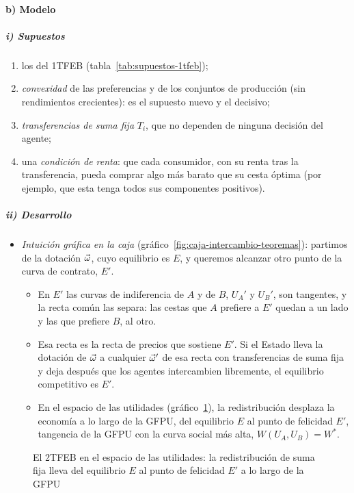 \documentclass[11pt]{article}
\begin{document}
\paragraph{b) Modelo}

\subparagraph{i) Supuestos}

\begin{enumerate}
\item los del 1TFEB (tabla~\ref{tab:supuestos-1tfeb});
\item \emph{convexidad} de las preferencias y de los conjuntos de producción (sin rendimientos crecientes): es el supuesto nuevo y el decisivo;
\item \emph{transferencias de suma fija} $T_i$, que no dependen de ninguna decisión del agente;
\item una \emph{condición de renta}: que cada consumidor, con su renta tras la transferencia, pueda comprar algo más barato que su cesta óptima (por ejemplo, que esta tenga todos sus componentes positivos).
\end{enumerate}

\subparagraph{ii) Desarrollo}

\begin{itemize}
\item \emph{Intuición gráfica en la caja} (gráfico~\ref{fig:caja-intercambio-teoremas}): partimos de la dotación $\vec{\omega}$, cuyo equilibrio es $E$, y queremos alcanzar otro punto de la curva de contrato, $E'$.
  \begin{itemize}
  \item En $E'$ las curvas de indiferencia de $A$ y de $B$, $U_A'$ y $U_B'$, son tangentes, y la recta común las separa: las cestas que $A$ prefiere a $E'$ quedan a un lado y las que prefiere $B$, al otro.
  \item Esa recta es la recta de precios que sostiene $E'$. Si el Estado lleva la dotación de $\vec{\omega}$ a cualquier $\vec{\omega}'$ de esa recta con transferencias de suma fija y deja después que los agentes intercambien libremente, el equilibrio competitivo es $E'$.
  \item En el espacio de las utilidades (gráfico~\ref{fig:segundo-teorema-gfpu}), la redistribución desplaza la economía a lo largo de la GFPU, del equilibrio $E$ al punto de felicidad $E'$, tangencia de la GFPU con la curva social más alta, $W(U_A,U_B)=W^*$.
  \end{itemize}
\end{itemize}

\begin{figure}[H]
\centering
\caption{El 2TFEB en el espacio de las utilidades: la redistribución de suma fija lleva del equilibrio $E$ al punto de felicidad $E'$ a lo largo de la GFPU}\label{fig:segundo-teorema-gfpu}
\end{figure}
\end{document}
